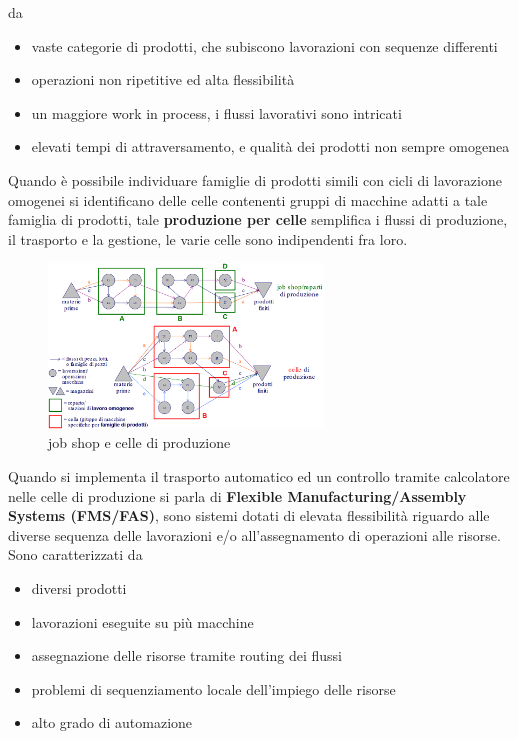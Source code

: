 \documentclass[10pt, letterpaper]{report}
\begin{document}
da \begin{itemize}
    \item vaste categorie di prodotti, che subiscono lavorazioni con sequenze differenti 
    \item operazioni non ripetitive ed alta flessibilità 
    \item un maggiore work in process, i flussi lavorativi sono intricati 
    \item elevati tempi di attraversamento, e qualità dei prodotti non sempre omogenea
\end{itemize}
Quando è possibile individuare famiglie di prodotti simili con cicli di lavorazione omogenei si identificano delle 
celle contenenti gruppi di macchine adatti a tale famiglia di prodotti, tale \textbf{produzione per celle} semplifica 
i flussi di produzione, il trasporto e la gestione, le varie celle sono indipendenti fra loro.\acc
\begin{figure}[h!]
    \centering
    \includegraphics[width=0.65\textwidth ]{images/celleReparti.png}
    \caption{job shop e celle di produzione}
\end{figure}
Quando si implementa il trasporto automatico ed un controllo tramite calcolatore nelle celle di produzione si 
parla di \textbf{Flexible Manufacturing/Assembly Systems (FMS/FAS)}, sono sistemi dotati di elevata 
 flessibilità riguardo alle diverse sequenza delle lavorazioni 
 e/o all'assegnamento di operazioni alle risorse. Sono caratterizzati da \begin{itemize}
    \item diversi prodotti 
    \item lavorazioni eseguite su più macchine 
    \item assegnazione delle risorse tramite routing dei flussi 
    \item problemi di sequenziamento locale dell'impiego delle risorse 
    \item alto grado di automazione
 \end{itemize}
\end{document}

